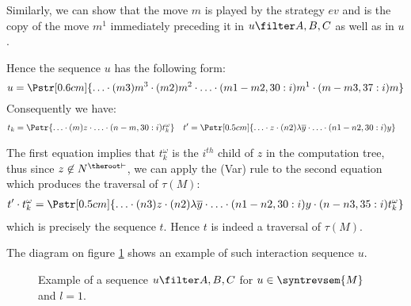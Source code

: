 \begin{itemize}[$\bullet$]
\begin{enumerate}
\begin{itemize}
\begin{enumerate}[(a)]
        Similarly, we can show that the move $m$ is played by the strategy $ev$ and is the copy of the move $m^1$ immediately preceding it in $u\filter A,B,C$ as well as in $u$.

        Hence the sequence $u$ has the following form:
        $$u = \Pstr[0.6cm]{ \ldots \cdot (m3){m^3} \cdot
                    (m2){m^2} \cdot \ldots \cdot
                    (m1-m2,30:i){m^1} \cdot (m-m3,37:i){m} } $$
        Consequently we have:
        \begin{align*}
        t_k &= \Pstr{ \ldots \cdot (m)z \cdot \ldots \cdot (n-m,30:i){t_k^\omega} }  &
        t'&= \Pstr[0.5cm]{ \ldots \cdot z \cdot (n2){\lambda \overline{y}} \cdot \ldots \cdot (n1-n2,30:i){y} }
        \end{align*}

        The first equation implies that $t_k^\omega$ is the $i^{th}$ child of $z$ in the computation tree,
        thus since $z\not\in N^{\theroot\vdash}$, we can apply the (Var) rule to the second equation which produces the traversal of $\tau(M)$:
        \begin{eqnarray*}
            t' \cdot t_k^\omega = \Pstr[0.5cm]{ \ldots \cdot (n3){z} \cdot (n2){\lambda \overline{y}} \cdot \ldots \cdot (n1-n2,30:i){y} \cdot (n-n3,35:i){t_k^\omega} }
        \end{eqnarray*}
        which is precisely the sequence $t$. Hence $t$ is indeed a traversal of $\tau(M)$.

    The diagram on figure \ref{fig:example_seq_u} shows an example of such interaction sequence $u$.
    \begin{figure}[htbp]
    \centering
    \caption{Example of a sequence $u\filter A,B,C$ for $u\in\syntrevsem{M}$ and $l=1$.}
    \label{fig:example_seq_u}
    \end{figure}



\end{enumerate}
\end{itemize}
\end{enumerate}
\end{itemize}
